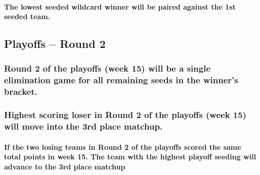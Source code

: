 \documentclass[
]{book}
\begin{document}
\hypertarget{the-lowest-seeded-wildcard-winner-will-be-paired-against-the-1st-seeded-team.}{%
\paragraph{The lowest seeded wildcard winner will be paired against the 1st seeded team.}\label{the-lowest-seeded-wildcard-winner-will-be-paired-against-the-1st-seeded-team.}}

\hypertarget{playoffs-round-2}{%
\subsection{Playoffs -- Round 2}\label{playoffs-round-2}}

\hypertarget{round-2-of-the-playoffs-week-15-will-be-a-single-elimination-game-for-all-remaining-seeds-in-the-winners-bracket.}{%
\subsubsection{Round 2 of the playoffs (week 15) will be a single elimination game for all remaining seeds in the winner's bracket.}\label{round-2-of-the-playoffs-week-15-will-be-a-single-elimination-game-for-all-remaining-seeds-in-the-winners-bracket.}}

\hypertarget{highest-scoring-loser-in-round-2-of-the-playoffs-week-15-will-move-into-the-3rd-place-matchup.}{%
\subsubsection{Highest scoring loser in Round 2 of the playoffs (week 15) will move into the 3rd place matchup.}\label{highest-scoring-loser-in-round-2-of-the-playoffs-week-15-will-move-into-the-3rd-place-matchup.}}

\hypertarget{if-the-two-losing-teams-in-round-2-of-the-playoffs-scored-the-same-total-points-in-week-15.-the-team-with-the-highest-playoff-seeding-will-advance-to-the-3rd-place-matchup}{%
\paragraph{If the two losing teams in Round 2 of the playoffs scored the same total points in week 15. The team with the highest playoff seeding will advance to the 3rd place matchup}\label{if-the-two-losing-teams-in-round-2-of-the-playoffs-scored-the-same-total-points-in-week-15.-the-team-with-the-highest-playoff-seeding-will-advance-to-the-3rd-place-matchup}}
\end{document}
